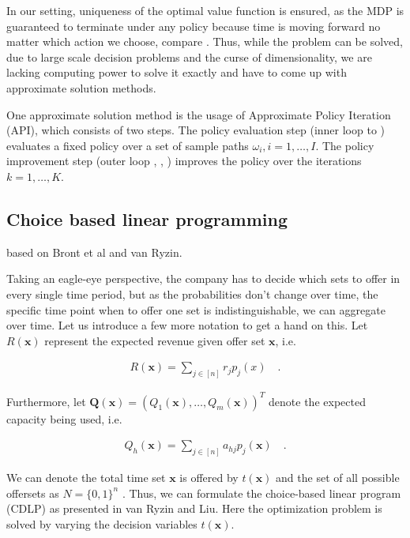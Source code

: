 In our setting, uniqueness of the optimal value function is ensured, as the MDP is guaranteed to terminate under any policy because time is moving forward no matter which action we choose, compare \cite{Sutton.2018}. Thus, while the problem can be solved, due to large scale decision problems and the curse of dimensionality, we are lacking computing power to solve it exactly and have to come up with approximate solution methods.

One approximate solution method is the usage of Approximate Policy Iteration (API), which consists of two steps. The policy evaluation step (inner loop  to ) evaluates a fixed policy over a set of sample paths $\omega_i, i = 1, \dots, I$. The policy improvement step (outer loop , , ) improves the policy over the iterations $k = 1, \dots, K$.



\subsection{Choice based linear programming}

based on Bront et al and van Ryzin.

Taking an eagle-eye perspective, the company has to decide which sets to offer in every single time period, but as the probabilities don't change over time, the specific time point when to offer one set is indistinguishable, we can aggregate over time. Let us introduce a few more notation to get a hand on this. Let $R(\mathbf{x})$ represent the expected revenue given offer set $\boldsymbol{x}$, i.e.

\begin{align}
	R(\boldsymbol{x}) = \sum_{j \in [n]} r_j p_j(x) \quad.
\end{align}

Furthermore, let $\boldsymbol{Q}(\boldsymbol{x}) = (Q_1(\boldsymbol{x}), \dots, Q_m(\boldsymbol{x}))^T$ denote the expected capacity being used, i.e. 

\begin{align}
	Q_h(\boldsymbol{x}) = \sum_{j \in [n]} a_{hj} p_j(\boldsymbol{x}) \quad.
\end{align}

We can denote the total time set $\boldsymbol{x}$ is offered by $t(\boldsymbol{x})$ and the set of all possible offersets as $N = \{0,1\}^n$ . Thus, we can formulate the choice-based linear program (CDLP)  as presented in van Ryzin and Liu. Here the optimization problem is solved by varying the decision variables $t(\boldsymbol{x})$.

